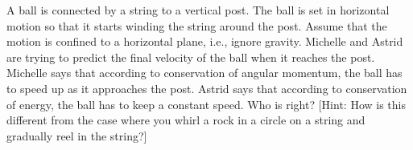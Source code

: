 A ball is connected by a string to a vertical post. The
ball is set in horizontal motion so that it starts winding
the string around the post. Assume that the motion is
confined to a horizontal plane, i.e., ignore gravity.
Michelle and Astrid are trying to predict the final velocity
of the ball when it reaches the post. Michelle says that
according to conservation of angular momentum, the ball has
to speed up as it approaches the post. Astrid says that
according to conservation of energy, the ball has to keep a
constant speed. Who is right? [Hint: How is this different
from the case where you whirl a rock in a circle on a string
and gradually reel in the string?]
